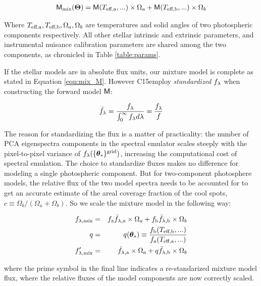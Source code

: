 \documentclass[twocolumn]{emulateapj}%
\newcommand{\iancze}{{\sc C15}}
\begin{document}
\begin{eqnarray} \label{eqn:mix_M}
\mathsf{M}_{\mathrm{mix}}({\bm \Theta}) = \mathsf{M}(T_\textrm{eff,a}, ...) \times \Omega_a + \mathsf{M}(T_\textrm{eff,b}, ...) \times \Omega_b
\end{eqnarray}


Where $T_\textrm{eff,a}, T_\textrm{eff,b}, \Omega_a, \Omega_b$ are temperatures and solid angles of two photospheric components respectively.  All other stellar intrinsic and extrinsic parameters, and instrumental nuisance calibration parameters are shared among the two components, as chronicled in Table \ref{table:params}.

If the stellar models are in absolute flux units, our mixture model is complete as stated in Equation \ref{eqn:mix_M}.  However \iancze employ \emph{standardized} $f_\lambda$ when constructing the forward model $\mathsf{M}$:


\begin{eqnarray} \label{eqn:normalization}
\bar {f_\lambda} = \frac{f_\lambda}{\int_{0}^{\infty} f_\lambda d\lambda} = \frac{f_\lambda}{f}
\end{eqnarray}

The reason for standardizing the flux is a matter of practicality: the number of PCA eigenspectra components in the spectral emulator scales steeply with the pixel-to-pixel variance of $f_{\lambda}(\{{\bm \theta}_{\ast}\}^\textrm{grid})$, increasing the computational cost of spectral emulation.  The choice to standardize fluxes makes no difference for modeling a single photospheric component.  But for two-component photosphere models, the relative flux of the two model spectra needs to be accounted for to get an accurate estimate of the areal coverage fraction of the cool spots, $c \equiv \Omega_b/(\Omega_a+\Omega_b)$.  So we scale the mixture model in the following way:

\begin{eqnarray} \label{eqn:norm_scaling}
f_{\lambda, \mathrm{mix}} &=& f_{\mathrm{a}} \bar f_{\lambda, \mathrm{a}} \times \Omega_a + f_{\mathrm{b}} \bar f_{\lambda, \mathrm{b}} \times \Omega_b \\
q &=& q({\bm \theta}_{\ast})\equiv \frac{f_{\mathrm{b}}(T_\textrm{eff,b}, ...)}{f_{\mathrm{a}}(T_\textrm{eff,a}, ...)} \\
f_{\lambda, \mathrm{mix}}^{\prime} &=& \bar f_{\lambda, \mathrm{a}} \times \Omega_a + q \bar f_{\lambda, \mathrm{b}} \times \Omega_b
\end{eqnarray}

where the prime symbol in the final line indicates a re-standarized mixture model flux, where the relative fluxes of the model components are now correctly scaled.
\end{document}
